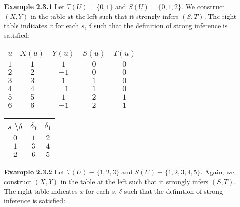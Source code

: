 \documentclass[11pt]{article}
\begin{document}
 \textbf{Example 2.3.1} \quad Let $ T(U) = \{0 , 1\} $ and $ S(U) = \{0, 1, 2\} $. We construct $ (X, Y) $ in the table at the left such that it strongly infers $ (S, T) $. The right table indicates $ x $ for each $ s $, $ \delta $ such that the definition of strong inference is satisfied: \\ 
 \begin {center}
 \begin{tabular}{ |c||c|c|c|c| } 

 \hline
 $ u $ & $ X(u) $ & $ Y(u) $ & $ S(u) $ & $ T(u) $ \\ 
 \hline
 \hline
 $ 1 $ & $ 1 $ & $ 1 $ & $ 0 $ & $ 0 $ \\
 \hline
 $ 2 $ & $ 2 $ & $ -1 $ & $ 0 $ & $ 0 $ \\
 \hline
 $ 3 $ & $ 3 $ & $ 1 $ & $ 1 $ & $ 0 $ \\
 \hline
 $ 4 $ & $ 4 $ & $ -1 $ & $ 1 $ & $ 0 $ \\
 \hline 
 $ 5 $ & $ 5 $ & $ 1 $ & $ 2 $ & $ 1 $ \\
 \hline 
 $ 6 $ & $ 6 $ & $ -1 $ & $ 2 $ & $ 1 $ \\
 \hline
 \end{tabular} 
 \quad 
 \begin{tabular}{ |c||c|c| } 

 \hline
 $ s $ \textbackslash $ \delta $ & $ \delta_0 $ & $ \delta_1 $ \\ 
 \hline
 \hline
 $ 0 $ & $ 1 $ & $ 2 $  \\
 \hline
 $ 1 $ & $ 3 $ & $ 4 $ \\
 \hline
 $ 2 $ & $ 6 $ & $ 5 $ \\
 \hline
 
 \end{tabular}
 \end{center}
 
 \bigskip
 \bigskip 
 \textbf{Example 2.3.2} \quad Let $ T(U) = \{1, 2, 3\} $ and $ S(U) = \{1, 2, 3, 4, 5\} $. Again, we construct $ (X, Y) $ in the table at the left such that it strongly infers $ (S, T) $. The right table indicates $ x $ for each $ s $, $ \delta $ such that the definition of strong inference is satisfied: \\ 
\end{document}
